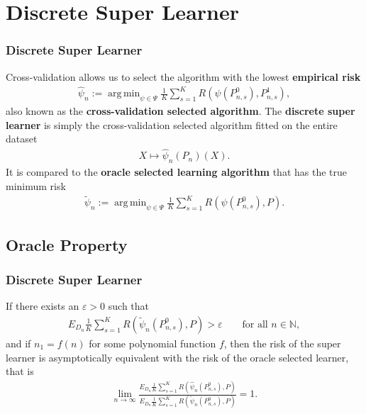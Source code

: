 \documentclass{beamer}
\DeclareMathOperator*{\argmin}{arg\,min}
\newcommand{\la}{\psi}
\newcommand{\lib}{\Psi}
\begin{document}
\section{Discrete Super Learner}
\begin{frame}
\frametitle{Discrete Super Learner}
Cross-validation allows us to select the algorithm with the lowest \textbf{empirical risk
}
\begin{align*}
    \hat{\la}_n := \argmin_{\la \in \lib} \frac{1}{K} \sum_{s = 1}^{K} R(\la(P_{n, s}^{0}) , P_{n, s}^{1}),  
\end{align*}
also known as the \textbf{cross-validation selected algorithm}. The \textbf{discrete super learner} is simply the cross-validation selected algorithm fitted on the entire dataset 
\begin{align*}
    X \mapsto \hat{\la}_n(P_n)(X).
\end{align*}
It is compared to the \textbf{oracle selected learning algorithm} that has the true minimum risk
\begin{align*}
    \tilde{\la}_n := \argmin_{\la \in \lib} \frac{1}{K} \sum_{s = 1}^{K} R(\la(P_{n, s}^{0}) , P).  
\end{align*}
\end{frame}

\subsection{Oracle Property}
\begin{frame}
    \frametitle{Discrete Super Learner}
\begin{theorem} \label{cor:dslasymptoticequivalence}
    If there exists an $ \varepsilon > 0 $ such that 
   \begin{align*}
       E_{D_n} \frac{1}{K} \sum_{s = 1}^{K} R(\tilde{\la}_n(P_{n, s}^{0}), P) > \varepsilon \qquad \text{for all } n \in \mathbb{N},
   \end{align*}
   and if $ n_1 = f(n) $ for some polynomial function $ f $, then the risk of the super learner is asymptotically equivalent with the risk of the oracle selected learner, that is
   \begin{align*}
       \lim_{n \to \infty} \frac{E_{D_n} \frac{1}{K} \sum_{s = 1}^{K} R(\hat{\la}_n(P_{n, s}^{0}), P)}{E_{D_n} \frac{1}{K} \sum_{s = 1}^{K} R(\tilde{\la}_n(P_{n, s}^{0}), P)} = 1.
   \end{align*}
\end{theorem}

\end{frame}
\end{document}
